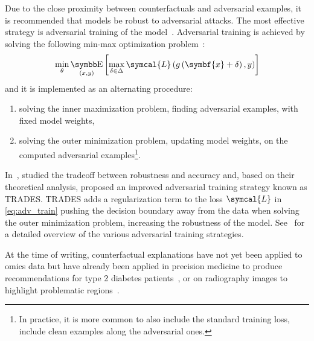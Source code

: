 \documentclass[../main.tex]{subfiles}
\begin{document}
	Due to the close proximity between counterfactuals and adversarial examples, it is recommended that models be robust to adversarial attacks.
	The most effective strategy is adversarial training of the model~\cite{huang2016learningstrongadversary}.
	Adversarial training is achieved by solving the following min-max optimization problem~\cite{AdvTrainingMinMax}:
	\begin{equation}
		\min_{\theta} \E_{(x,y)}\left[\max_{\delta \in \Delta} \symcal{L}\left(g\left(\symbf{x}+\delta\right), y \right)  \right] \label{eq:adv_train}
	\end{equation}
	and it is implemented as an alternating procedure:
	\begin{enumerate}[nosep]
		\item solving the inner maximization problem, \ie{}finding adversarial examples, with fixed model weights,
		\item solving the outer minimization problem, \ie{}updating model weights, on the computed adversarial examples\footnote{In practice, it is more common to also include the standard training loss, \ie{}include clean examples along the adversarial ones.}.
	\end{enumerate}
	In~\cite{TRADES}, \citeauthor{TRADES} studied the tradeoff between robustness and accuracy and, based on their theoretical analysis, proposed an improved adversarial training strategy known as TRADES\@.
	TRADES adds a regularization term to the loss \(\symcal{L}\) in \cref{eq:adv_train} pushing the decision boundary away from the data when solving the outer minimization problem, \ie{}increasing the robustness of the model.
	See~\cite{AdvTrainSurvey} for a detailed overview of the various adversarial training strategies.

	At the time of writing, counterfactual explanations have not yet been applied to omics data but have already been applied in precision medicine to produce recommendations for type 2 diabetes patients~\cite{Lenatti2022}, or on radiography images to highlight problematic regions~\cite{Thiagarajan2022,Mertes2022}.

\end{document}
